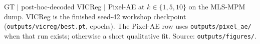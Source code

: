 GT $|$ post-hoc-decoded VICReg $|$ Pixel-AE at $k\in\{1,5,10\}$ on the MLS-MPM dump. VICReg is the finished seed-42 workshop checkpoint (\texttt{outputs/vicreg/best.pt}, \WorkshopEpochs{} epochs). The Pixel-AE row uses \texttt{outputs/pixel\_ae/} when that run exists; otherwise a short qualitative fit. Source: \texttt{outputs/figures/}.
